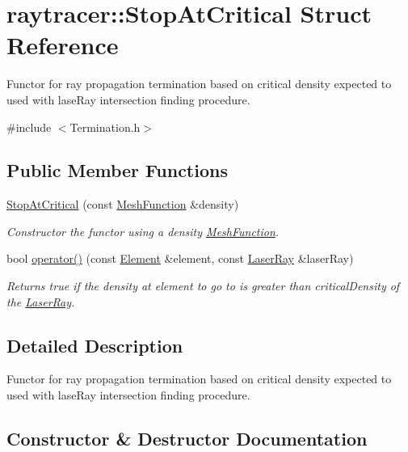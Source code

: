 \hypertarget{structraytracer_1_1StopAtCritical}{}\section{raytracer\+:\+:Stop\+At\+Critical Struct Reference}
\label{structraytracer_1_1StopAtCritical}


Functor for ray propagation termination based on critical density expected to used with lase\+Ray intersection finding procedure.  




{\ttfamily \#include $<$Termination.\+h$>$}

\subsection*{Public Member Functions}
\begin{DoxyCompactItemize}
\item 
\hyperlink{structraytracer_1_1StopAtCritical_a61743eacd97c1af03146aa64aa9c95e5}{Stop\+At\+Critical} (const \hyperlink{classraytracer_1_1MeshFunction}{Mesh\+Function} \&density)
\begin{DoxyCompactList}\small\item\em Constructor the functor using a density \hyperlink{classraytracer_1_1MeshFunction}{Mesh\+Function}. \end{DoxyCompactList}\item 
bool \hyperlink{structraytracer_1_1StopAtCritical_acc71054d773ea6fe0df52986d5d1512e}{operator()} (const \hyperlink{classraytracer_1_1Element}{Element} \&element, const \hyperlink{classraytracer_1_1LaserRay}{Laser\+Ray} \&laser\+Ray)
\begin{DoxyCompactList}\small\item\em Returns true if the density at element to go to is greater than critical\+Density of the \hyperlink{classraytracer_1_1LaserRay}{Laser\+Ray}. \end{DoxyCompactList}\end{DoxyCompactItemize}


\subsection{Detailed Description}
Functor for ray propagation termination based on critical density expected to used with lase\+Ray intersection finding procedure. 

\subsection{Constructor \& Destructor Documentation}
\mbox{\label{structraytracer_1_1StopAtCritical_a61743eacd97c1af03146aa64aa9c95e5}} 
